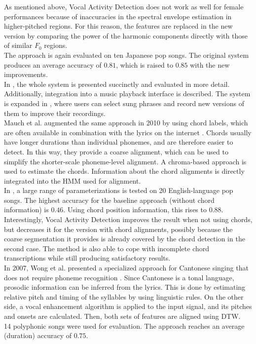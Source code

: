 As mentioned above, Vocal Activity Detection does not work as well for female performances because of inaccuracies in the spectral envelope estimation in higher-pitched regions. For this reason, the features are replaced in the new version by comparing the power of the harmonic components directly with those of similar $F_0$ regions.\\
The approach is again evaluated on ten Japanese pop songs. The original system produces an average accuracy of $0.81$, which is raised to $0.85$ with the new improvements.\\
In \cite{FujiharaGOO11}, the whole system is presented succinctly and evaluated in more detail. Additionally, integration into a music playback interface is described. The system is expanded in \cite{vocarefiner}, where users can select sung phrases and record new versions of them to improve their recordings.\\

Mauch et al. augmented the same approach in 2010 by using chord labels, which are often available in combination with the lyrics on the internet \cite{mauch_alignment2010}\cite{mauch_alignment2}. Chords usually have longer durations than individual phonemes, and are therefore easier to detect. In this way, they provide a coarse alignment, which can be used to simplify the shorter-scale phoneme-level alignment. A chroma-based approach is used to estimate the chords. Information about the chord alignments is directly integrated into the HMM used for alignment.\\
In \cite{mauch_alignment2}, a large range of parameterizations is tested on 20 English-language pop songs. The highest accuracy for the baseline approach (without chord information) is $0.46$. Using chord position information, this rises to $0.88$. Interestingly, Vocal Activity Detection improves the result when not using chords, but decreases it for the version with chord alignments, possibly because the coarse segmentation it provides is already covered by the chord detection in the second case. The method is also able to cope with incomplete chord transcriptions while still producing satisfactory results.\\

In 2007, Wong et al. presented a specialized approach for Cantonese singing that does not require phoneme recognition \cite{WongSW07}. Since Cantonese is a tonal language, prosodic information can be inferred from the lyrics. This is done by estimating relative pitch and timing of the syllables by using linguistic rules. On the other side, a vocal enhancement algorithm is applied to the input signal, and its pitches and onsets are calculated. Then, both sets of features are aligned using DTW.\\ 
14 polyphonic songs were used for evaluation. The approach reaches an average (duration) accuracy of $0.75$.\\

